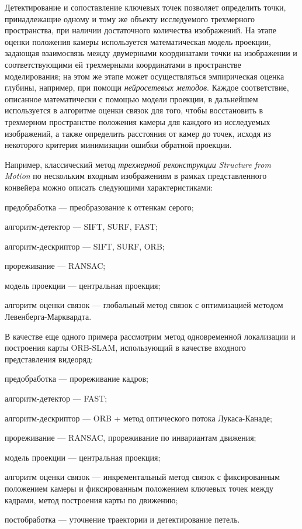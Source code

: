 Детектирование и сопоставление ключевых точек позволяет определить точки, принадлежащие одному и тому же объекту исследуемого трехмерного пространства, при наличии достаточного количества изображений. На этапе оценки положения камеры используется математическая модель проекции, задающая взаимосвязь между двумерными координатами точки на изображении и соответствующими ей трехмерными координатами в пространстве моделирования; на этом же этапе может осуществляться эмпирическая оценка глубины, например, при помощи \textit{нейросетевых методов}. Каждое соответствие, описанное математически с помощью модели проекции, в дальнейшем используется в алгоритме оценки связок для того, чтобы восстановить в трехмерном пространстве положения камеры для каждого из исследуемых изображений, а также определить расстояния от камер до точек, исходя из некоторого критерия минимизации ошибки обратной проекции.

Например, классический метод \textit{трехмерной реконструкции} \textit{Structure from Motion} по нескольким входным изображениям в рамках представленного конвейера можно описать следующими характеристиками:
\begin{textitemize}
    \item предобработка --- преобразование к оттенкам серого;
    \item алгоритм-детектор --- SIFT, SURF, FAST;
    \item алгоритм-дескриптор --- SIFT, SURF, ORB;
    \item прореживание --- RANSAC;
    \item модель проекции --- центральная проекция;
    \item алгоритм оценки связок --- глобальный метод связок с оптимизацией методом Левенберга-Марквардта.
\end{textitemize}
В качестве еще одного примера рассмотрим метод одновременной локализации и построения карты ORB-SLAM, использующий в качестве входного представления видеоряд:
\begin{textitemize}
    \item предобработка --- прореживание кадров;
    \item алгоритм-детектор --- FAST;
    \item алгоритм-дескриптор --- ORB + метод оптического потока Лукаса-Канаде;
    \item прореживание --- RANSAC, прореживание по инвариантам движения;
    \item модель проекции --- центральная проекция;
    \item алгоритм оценки связок --- инкрементальный метод связок с фиксированным положением камеры и фиксированным положением ключевых точек между кадрами, метод построения карты по движению;
    \item постобработка --- уточнение траектории и детектирование петель.
\end{textitemize}


